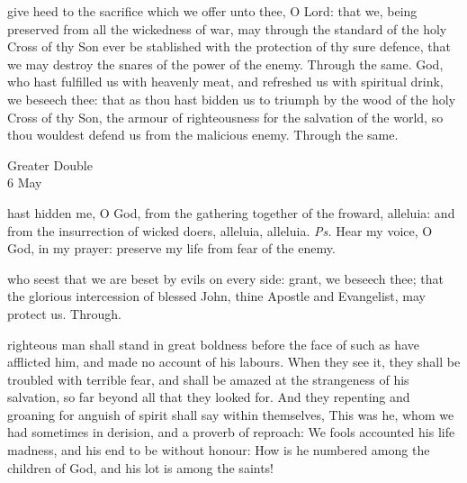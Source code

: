 \secret
{} give heed to the sacrifice which we offer unto thee, O Lord: that we, being preserved from all the wickedness of war, may through the standard of the holy Cross of thy Son ever be stablished with the protection of thy sure defence, that we may destroy the snares of the power of the enemy. Through the same.
\postcommunion
{} God, who hast fulfilled us with heavenly meat, and refreshed us with spiritual drink, we beseech thee: that as thou hast bidden us to triumph by the wood of the holy Cross of thy Son, the armour of righteousness for the salvation of the world, so thou wouldest defend us from the malicious enemy. Through the same.

\begin{inhead}
    {Greater Double\\
6 May}
\end{inhead}
\par\noindent
{}
\par\noindent
{}
\par\noindent
{}

\introit
{} hast hidden me, O God, from the gathering together of the froward, alleluia: and from the insurrection of wicked doers, alleluia, alleluia. \textit{Ps.} Hear my voice, O God, in my prayer: preserve my life from fear of the enemy.

\collect
{} who seest that we are beset by evils on every side: grant, we beseech thee; that the glorious intercession of blessed John, thine Apostle and Evangelist, may protect us. Through.

 righteous man shall stand in great boldness before the face of such as have afflicted him, and made no account of his labours. When they see it, they shall be troubled with terrible fear, and shall be amazed at the strangeness of his salvation, so far beyond all that they looked for. And they repenting and groaning for anguish of spirit shall say within themselves, This was he, whom we had sometimes in derision, and a proverb of reproach: We fools accounted his life madness, and his end to be without honour: How is he numbered among the children of God, and his lot is among the saints!

